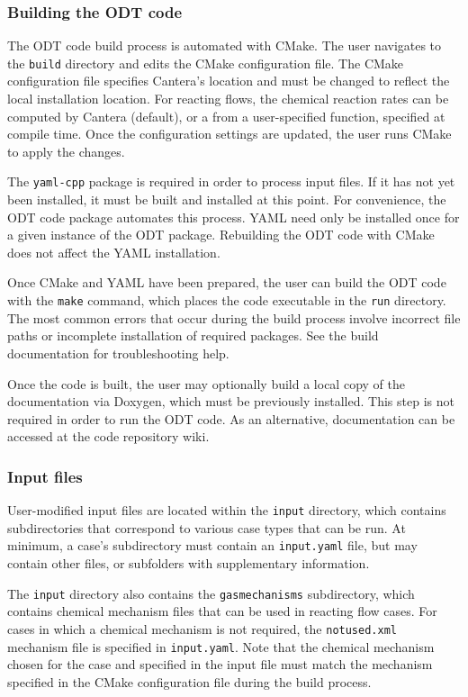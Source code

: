 \documentclass[preprint,12pt, a4paper]{elsarticle}
\begin{document}
\subsubsection{Building the ODT code}

The ODT code build process is automated with CMake. The user navigates to the \texttt{build} directory and edits the CMake configuration file. The CMake configuration file specifies Cantera's location and must be changed to reflect the local installation location. For reacting flows, the chemical reaction rates can be computed by Cantera (default), or a from a user-specified function, specified at compile time. Once the configuration settings are updated, the user runs CMake to apply the changes. 

The \texttt{yaml-cpp} package is required in order to process input files. If it has not yet been installed, it must be built and installed at this point. For convenience, the ODT code package automates this process. YAML need only be installed once for a given instance of the ODT package. Rebuilding the ODT code with CMake does not affect the YAML installation. 

Once CMake and YAML have been prepared, the user can build the ODT code with the \texttt{make} command, which places the code executable in the \texttt{run} directory. The most common errors that occur during the build process involve incorrect file paths or incomplete installation of required packages. See the build documentation for troubleshooting help. 

Once the code is built, the user may optionally build a local copy of the documentation via Doxygen, which must be previously installed. This step is not required in order to run the ODT code. As an alternative, documentation can be accessed at the code repository wiki. 

\subsubsection{Input files}

User-modified input files are located within the \texttt{input} directory, which contains subdirectories that correspond to various case types that can be run. At minimum, a case's subdirectory must contain an \texttt{input.yaml} file, but may contain other files, or subfolders with supplementary information. 

The \texttt{input} directory also contains the \texttt{gas\textunderscore mechanisms} subdirectory, which contains chemical mechanism files that can be used in reacting flow cases. For cases in which a chemical mechanism is not required, the \texttt{not\textunderscore used.xml} mechanism file is specified in \texttt{input.yaml}. Note that the chemical mechanism chosen for the case and specified in the input file must match the mechanism specified in the CMake configuration file during the build process. 
\end{document}
